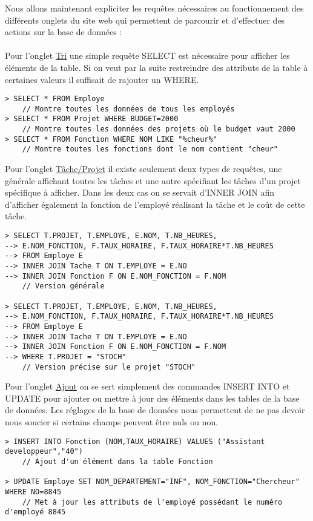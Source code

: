 Nous allons maintenant expliciter les requêtes nécessaires au fonctionnement des différents onglets du site web qui permettent de parcourir et d'effectuer des actions sur la base de données :
\\\\
Pour l'onglet \href{http://ms8db.montefiore.ulg.ac.be/s191230/search.php}{Tri} une simple requête SELECT est nécessaire pour afficher les éléments de la table. Si on veut par la suite restreindre des attributs de la table à certaines valeurs il suffisait de rajouter un WHERE.
\begin{verbatim}
> SELECT * FROM Employe 
    // Montre toutes les données de tous les employés
> SELECT * FROM Projet WHERE BUDGET=2000 
    // Montre toutes les données des projets où le budget vaut 2000
> SELECT * FROM Fonction WHERE NOM LIKE "%cheur%" 
    // Montre toutes les fonctions dont le nom contient "cheur"
\end{verbatim}

Pour l'onglet \href{http://ms8db.montefiore.ulg.ac.be/s191230/tasks_project.php}{Tâche/Projet} il existe seulement deux types de requêtes, une générale affichant toutes les tâches et une autre spécifiant les tâches d'un projet spécifique à afficher. Dans les deux cas on se servait d'INNER JOIN afin d'afficher également la fonction de l'employé réalisant la tâche et le coût de cette tâche.

\begin{verbatim}
> SELECT T.PROJET, T.EMPLOYE, E.NOM, T.NB_HEURES, 
--> E.NOM_FONCTION, F.TAUX_HORAIRE, F.TAUX_HORAIRE*T.NB_HEURES
--> FROM Employe E 
--> INNER JOIN Tache T ON T.EMPLOYE = E.NO
--> INNER JOIN Fonction F ON E.NOM_FONCTION = F.NOM
    // Version générale

> SELECT T.PROJET, T.EMPLOYE, E.NOM, T.NB_HEURES, 
--> E.NOM_FONCTION, F.TAUX_HORAIRE, F.TAUX_HORAIRE*T.NB_HEURES
--> FROM Employe E 
--> INNER JOIN Tache T ON T.EMPLOYE = E.NO
--> INNER JOIN Fonction F ON E.NOM_FONCTION = F.NOM
--> WHERE T.PROJET = "STOCH"
    // Version précise sur le projet "STOCH"
\end{verbatim}

Pour l'onglet \href{http://ms8db.montefiore.ulg.ac.be/s191230/add.php}{Ajout} on se sert simplement des commandes INSERT INTO et UPDATE pour ajouter ou mettre à jour des éléments dans les tables de la base de données. Les réglages de la base de données nous permettent de ne pas devoir nous soucier si certains champs peuvent être nuls ou non.

\begin{verbatim}
> INSERT INTO Fonction (NOM,TAUX_HORAIRE) VALUES ("Assistant developpeur","40")
    // Ajout d'un élément dans la table Fonction

> UPDATE Employe SET NOM_DEPARTEMENT="INF", NOM_FONCTION="Chercheur" WHERE NO=8845
    // Met à jour les attributs de l'employé possédant le numéro d'employé 8845
\end{verbatim}

